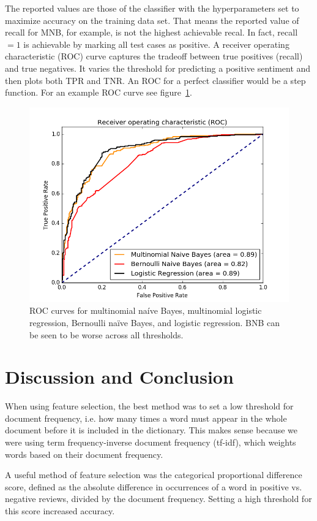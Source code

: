 \documentclass{article} %
\begin{document}
	The reported values are those of the classifier with the hyperparameters set to maximize accuracy on the training data set. That means the reported value of recall for MNB, for example, is not the highest achievable recal. In fact, recall $=1$ is achievable by marking all test cases as positive. A receiver operating characteristic (ROC) curve captures the tradeoff between true positives (recall) and true negatives. It varies the threshold for predicting a positive sentiment and then plots both TPR and TNR. An ROC for a perfect classifier would be a step function. For an example ROC curve see figure~\ref{fig:roc}.
	\begin{figure}[h]
		\centering
		\includegraphics[scale=.5]{ROC}
		\caption{ROC curves for multinomial na\'ive Bayes, multinomial logistic regression, Bernoulli na\"ive Bayes, and logistic regression. BNB can be seen to be worse across all thresholds.}
		\label{fig:roc}
	\end{figure}
		
	\section{Discussion and Conclusion}
	
	When using feature selection, the best method was to set a low threshold for document frequency, i.e. how many times a word must appear in the whole document before it is included in the dictionary. This makes sense because we were using term frequency-inverse document frequency (tf-idf), which weights words based on their document frequency. 
	
	A useful method of feature selection was the categorical proportional difference score, defined as the absolute difference in occurrences of a word in positive vs. negative reviews, divided by the document frequency. Setting a high threshold for this score increased accuracy. 
	
\end{document}
